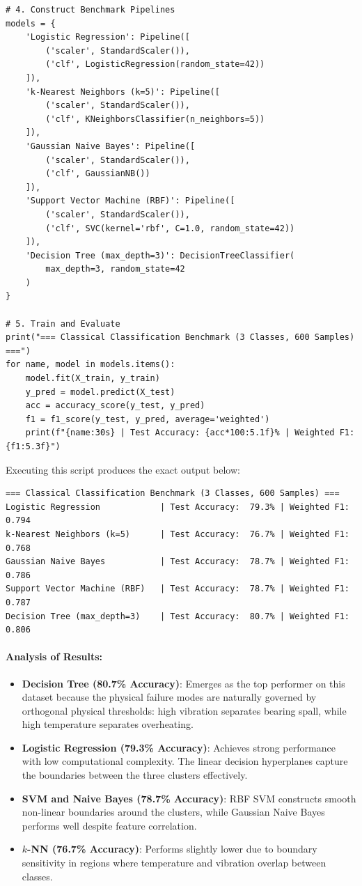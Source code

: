 \begin{lstlisting}[style=pythonstyle]
# 4. Construct Benchmark Pipelines
models = {
    'Logistic Regression': Pipeline([
        ('scaler', StandardScaler()),
        ('clf', LogisticRegression(random_state=42))
    ]),
    'k-Nearest Neighbors (k=5)': Pipeline([
        ('scaler', StandardScaler()),
        ('clf', KNeighborsClassifier(n_neighbors=5))
    ]),
    'Gaussian Naive Bayes': Pipeline([
        ('scaler', StandardScaler()),
        ('clf', GaussianNB())
    ]),
    'Support Vector Machine (RBF)': Pipeline([
        ('scaler', StandardScaler()),
        ('clf', SVC(kernel='rbf', C=1.0, random_state=42))
    ]),
    'Decision Tree (max_depth=3)': DecisionTreeClassifier(
        max_depth=3, random_state=42
    )
}

# 5. Train and Evaluate
print("=== Classical Classification Benchmark (3 Classes, 600 Samples) ===")
for name, model in models.items():
    model.fit(X_train, y_train)
    y_pred = model.predict(X_test)
    acc = accuracy_score(y_test, y_pred)
    f1 = f1_score(y_test, y_pred, average='weighted')
    print(f"{name:30s} | Test Accuracy: {acc*100:5.1f}% | Weighted F1: {f1:5.3f}")
\end{lstlisting}

Executing this script produces the exact output below:
\begin{lstlisting}[style=outputstyle]
=== Classical Classification Benchmark (3 Classes, 600 Samples) ===
Logistic Regression            | Test Accuracy:  79.3% | Weighted F1: 0.794
k-Nearest Neighbors (k=5)      | Test Accuracy:  76.7% | Weighted F1: 0.768
Gaussian Naive Bayes           | Test Accuracy:  78.7% | Weighted F1: 0.786
Support Vector Machine (RBF)   | Test Accuracy:  78.7% | Weighted F1: 0.787
Decision Tree (max_depth=3)    | Test Accuracy:  80.7% | Weighted F1: 0.806
\end{lstlisting}

\paragraph{Analysis of Results:}
\begin{itemize}
    \item \textbf{Decision Tree (80.7\% Accuracy)}: Emerges as the top performer on this dataset because the physical failure modes are naturally governed by orthogonal physical thresholds: high vibration separates bearing spall, while high temperature separates overheating.
    \item \textbf{Logistic Regression (79.3\% Accuracy)}: Achieves strong performance with low computational complexity. The linear decision hyperplanes capture the boundaries between the three clusters effectively.
    \item \textbf{SVM and Naive Bayes (78.7\% Accuracy)}: RBF SVM constructs smooth non-linear boundaries around the clusters, while Gaussian Naive Bayes performs well despite feature correlation.
    \item \textbf{$k$-NN (76.7\% Accuracy)}: Performs slightly lower due to boundary sensitivity in regions where temperature and vibration overlap between classes.
\end{itemize}

